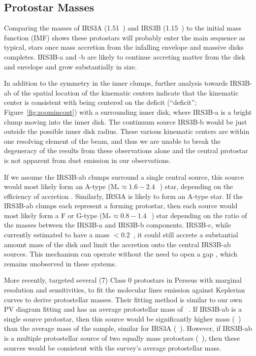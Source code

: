 
\subsection{Protostar Masses}
Comparing the masses of IRS3A (1.51~\solm) and IRS3B (1.15~\solm) to the initial mass function (IMF) \citep[young cluster IMF towards binaries;][]{2005ASSL..327...41C} shows these protostars will probably enter the main sequence as typical, stars once mass accretion from the infalling envelope and massive disks completes. IRS3B-a and -b are likely to continue accreting matter from the disk and envelope and grow substantially in size. 

In addition to the symmetry in the inner clumps, further analysis towards IRS3B-ab of the spatial location of the kinematic centers indicate that the kinematic center is consistent with being centered on the deficit (``deficit''; Figure~\ref{fig:zoomincont}) with a surrounding inner disk, where IRS3B-a is a bright clump moving into the inner disk. The continuum source IRS3B-b would be just outside the possible inner disk radius. These various kinematic centers are within one resolving element of the \cso\space beam, and thus we are unable to break the degeneracy of the results from these observations alone and the central protostar is not apparent from dust emission in our observations.

If we assume the IRS3B-ab clumps surround a single central source, this source would most likely form an A-type (M$_{*}\approx1.6-2.4~$~\solm) star, depending on the efficiency of accretion \citep[10-15\%;][]{2007ApJ...656..293J}. Similarly, IRS3A is likely to form an A-type star. If the IRS3B-ab clumps each represent a forming protostar, then each source would most likely form a F or G-type (M$_{*}\approx0.8-1.4~$~\solm) star depending on the ratio of the masses between the IRS3B-a and IRS3B-b components. IRS3B-c, while currently estimated to have a mass $<0.2$~\solm, it could still accrete a substantial amount mass of the disk and limit the accretion onto the central IRS3B-ab sources. This mechanism can operate without the need to open a gap \citep[][]{1996LNP...465..115A}, which remains unobserved in these systems.

More recently, \citet{2020AA...635A..15M}\space targeted several (7) Class 0 protostars in Perseus with marginal resolution and sensitivities, to fit the molecular lines emission against Keplerian curves to derive protostellar masses. Their fitting method is similar to our own PV diagram fitting and has an average protostellar mass of ~\msun. If IRS3B-ab is a single source protostar, then this source would be significantly higher mass (\mstar{}~\msun) than the average mass of the sample, similar for IRS3A (\mstar{}~\msun). However, if IRS3B-ab is a multiple protostellar source of two equally mass protostars (\mstar{}~\msun), then these sources would be consistent with the survey's average protostellar mass.

